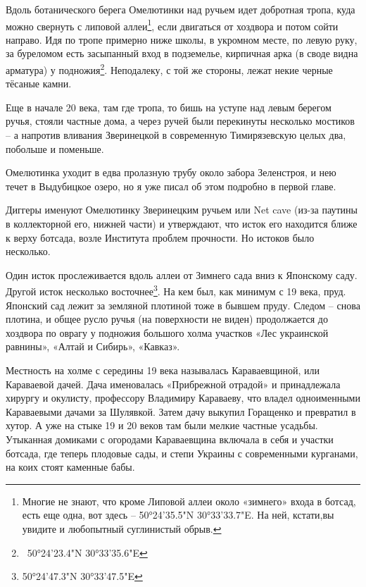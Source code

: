 Вдоль ботанического берега Омелютинки над ручьем идет добротная тропа, куда можно свернуть с липовой аллеи\footnote{Многие не знают, что кроме Липовой аллеи около «зимнего» входа в ботсад, есть еще одна, вот здесь – 50°24'35.5"N 30°33'33.7"E. На ней, кстати,вы увидите и любопытный суглинистый обрыв.}, если двигаться от хоздвора и потом сойти направо. Идя по тропе примерно ниже школы, в укромном месте, по левую руку, за буреломом есть засыпанный вход в подземелье, кирпичная арка (в своде видна арматура) у подножия\footnote{~50°24'23.4"N 30°33'35.6"E}. Неподалеку, с той же стороны, лежат некие черные тёсаные камни.

Еще в начале 20 века, там где тропа, то бишь на уступе над левым берегом ручья, стояли частные дома, а через ручей были перекинуты несколько мостиков – а напротив вливания Зверинецкой в современную Тимирязевскую целых два, побольше и поменьше.

Омелютинка уходит в едва пролазную трубу около забора Зеленстроя, и нею течет в Выдубицкое озеро, но я уже писал об этом подробно в первой главе.

Диггеры именуют Омелютинку Зверинецким ручьем или Net cave (из-за паутины в коллекторной его, нижней части) и утверждают, что исток его находится ближе к верху ботсада, возле Института проблем прочности. Но истоков было несколько.

Один исток прослеживается вдоль аллеи от Зимнего сада вниз к Японскому саду. Другой исток несколько восточнее\footnote{50°24'47.3"N 30°33'47.5"E}. На кем был, как минимум с 19 века, пруд. Японский сад лежит за земляной плотиной тоже в бывшем пруду. Следом – снова плотина, и общее русло ручья (на поверхности не виден) продолжается до хоздвора по оврагу у подножия большого холма участков «Лес украинской равнины», «Алтай и Сибирь», «Кавказ».


Местность на холме с середины 19 века называлась Караваевщиной, или Караваевой дачей. Дача именовалась «Прибрежной отрадой» и принадлежала хирургу и окулисту, профессору Владимиру Караваеву, что владел одноименными Караваевыми дачами за Шулявкой. Затем дачу выкупил Горащенко и превратил в хутор. А уже на стыке 19 и 20 веков там были  мелкие частные усадьбы. Утыканная домиками с огородами Караваевщина включала в себя и участки ботсада, где теперь плодовые сады, и степи Украины с современными  курганами, на коих стоят каменные бабы.

